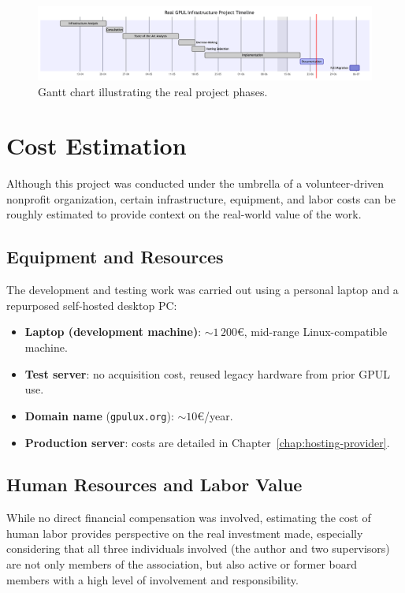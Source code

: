 \begin{figure}[H]
  \centering
  \includegraphics[width=1\textwidth]{imaxes/gantt-real.png}
  \caption{Gantt chart illustrating the real project phases.}
  \label{fig:gantt-real}
\end{figure}

\section{Cost Estimation}

Although this project was conducted under the umbrella of a volunteer-driven nonprofit organization, certain infrastructure, equipment, and labor costs can be roughly estimated to provide context on the real-world value of the work.

\subsection*{Equipment and Resources}

The development and testing work was carried out using a personal laptop and a repurposed self-hosted desktop PC:

\begin{itemize}
  \item \textbf{Laptop (development machine)}: \(\sim 1\,200€\), mid-range Linux-compatible machine.
  \item \textbf{Test server}: no acquisition cost, reused legacy hardware from prior GPUL use.
  \item \textbf{Domain name} (\texttt{gpulux.org}): \(\sim 10€\)/year.
  \item \textbf{Production server}: costs are detailed in Chapter~\ref{chap:hosting-provider}.
\end{itemize}

\subsection*{Human Resources and Labor Value}

While no direct financial compensation was involved, estimating the cost of human labor provides perspective on the real investment made, especially considering that all three individuals involved (the author and two supervisors) are not only members of the association, but also active or former board members with a high level of involvement and responsibility.

